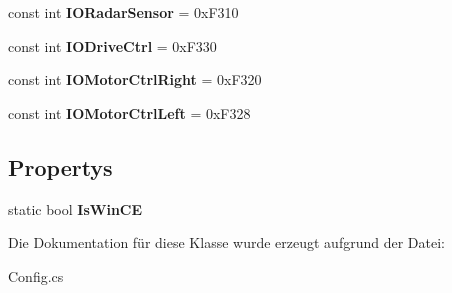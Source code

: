 \begin{DoxyCompactItemize}
\item 
\hypertarget{class_robot_ctrl_1_1_config_a5ec60e0aa55a87f197bf88cfca362f4c}{
const int {\bfseries IORadarSensor} = 0xF310}
\label{class_robot_ctrl_1_1_config_a5ec60e0aa55a87f197bf88cfca362f4c}

\item 
\hypertarget{class_robot_ctrl_1_1_config_a64fd0db1d0bcb248ab20b1511507bd10}{
const int {\bfseries IODriveCtrl} = 0xF330}
\label{class_robot_ctrl_1_1_config_a64fd0db1d0bcb248ab20b1511507bd10}

\item 
\hypertarget{class_robot_ctrl_1_1_config_aa3e15e92eb2fe300cd20690de0ed0d11}{
const int {\bfseries IOMotorCtrlRight} = 0xF320}
\label{class_robot_ctrl_1_1_config_aa3e15e92eb2fe300cd20690de0ed0d11}

\item 
\hypertarget{class_robot_ctrl_1_1_config_aa1d6da7ec6a2d563c8faec2663e50350}{
const int {\bfseries IOMotorCtrlLeft} = 0xF328}
\label{class_robot_ctrl_1_1_config_aa1d6da7ec6a2d563c8faec2663e50350}

\end{DoxyCompactItemize}
\subsection*{Propertys}
\begin{DoxyCompactItemize}
\item 
\hypertarget{class_robot_ctrl_1_1_config_ab60bbdfe5e8dfff6ff29e22b64a120f5}{
static bool {\bfseries IsWinCE}}
\label{class_robot_ctrl_1_1_config_ab60bbdfe5e8dfff6ff29e22b64a120f5}

\end{DoxyCompactItemize}


Die Dokumentation für diese Klasse wurde erzeugt aufgrund der Datei:\begin{DoxyCompactItemize}
\item 
Config.cs\end{DoxyCompactItemize}
